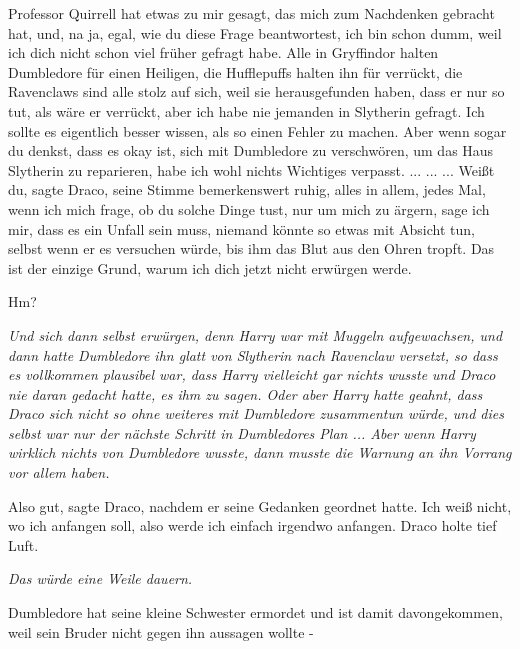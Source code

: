 \glqq{}Professor Quirrell hat etwas zu mir gesagt, das mich zum Nachdenken
gebracht hat, und, na ja, egal, wie du diese Frage beantwortest, ich bin schon
dumm, weil ich dich nicht schon viel früher gefragt habe. Alle in Gryffindor
halten Dumbledore für einen Heiligen, die Hufflepuffs halten ihn für verrückt,
die Ravenclaws sind alle stolz auf sich, weil sie herausgefunden haben, dass er
nur so tut, als wäre er verrückt, aber ich habe nie jemanden in Slytherin
gefragt. Ich sollte es eigentlich besser wissen, als so einen Fehler zu machen.
Aber wenn sogar du denkst, dass es okay ist, sich mit Dumbledore zu verschwören,
um das Haus Slytherin zu reparieren, habe ich wohl nichts Wichtiges
verpasst.\grqq{} ... ... ... \glqq{}Weißt du\grqq{}, sagte Draco, seine Stimme
bemerkenswert ruhig, alles in allem, \glqq{}jedes Mal, wenn ich mich frage, ob du
solche Dinge tust, nur um mich zu ärgern, sage ich mir, dass es ein Unfall sein
muss, niemand könnte so etwas mit Absicht tun, selbst wenn er es versuchen
würde, bis ihm das Blut aus den Ohren tropft. Das ist der einzige Grund, warum
ich dich jetzt nicht erwürgen werde.\grqq{}

\glqq{}Hm?\grqq{}

\emph{Und sich dann selbst erwürgen, denn Harry war mit Muggeln aufgewachsen,
und dann hatte Dumbledore ihn glatt von Slytherin nach Ravenclaw versetzt, so
dass es vollkommen plausibel war, dass Harry vielleicht gar nichts wusste und
Draco nie daran gedacht hatte, es ihm zu sagen. Oder aber Harry hatte geahnt,
dass Draco sich nicht so ohne weiteres mit Dumbledore zusammentun würde, und
dies selbst war nur der nächste Schritt in Dumbledores Plan ... Aber wenn Harry
wirklich nichts von Dumbledore wusste, dann musste die Warnung an ihn Vorrang
vor allem haben.}

\glqq{}Also gut\grqq{}, sagte Draco, nachdem er seine Gedanken geordnet hatte.
\glqq{}Ich weiß nicht, wo ich anfangen soll, also werde ich einfach irgendwo
anfangen.\grqq{} Draco holte tief Luft.

\emph{Das würde eine Weile dauern.}

\glqq{}Dumbledore hat seine kleine Schwester ermordet und ist damit
davongekommen, weil sein Bruder nicht gegen ihn aussagen wollte -\grqq{}

